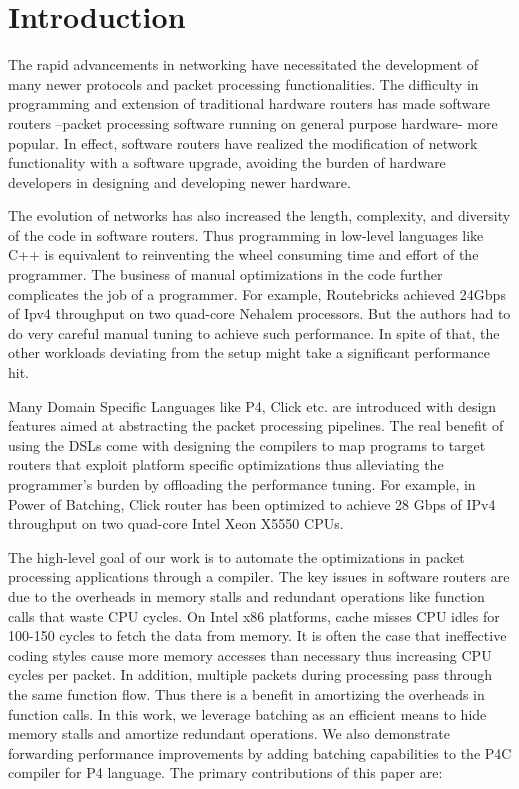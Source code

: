 \section{Introduction}
\label{introduction}
The rapid advancements in networking have necessitated the development of many newer protocols and packet processing functionalities. The difficulty in programming and extension of traditional hardware routers has made software routers --packet processing software running on general purpose hardware- more popular. In effect, software routers have realized the modification of network functionality with a software upgrade, avoiding the burden of hardware developers in designing and developing newer hardware.

The evolution of networks has also increased the length, complexity, and diversity of the code in software routers. Thus programming in low-level languages like C++ is equivalent to reinventing the wheel consuming time and effort of the programmer. The business of manual optimizations in the code further complicates the job of a programmer. For example, Routebricks achieved 24Gbps of Ipv4 throughput on two quad-core Nehalem processors. But the authors had to do very careful manual tuning to achieve such performance. In spite of that, the other workloads deviating from the setup might take a significant performance hit.

Many Domain Specific Languages like P4\cite{Bosshart:2014:PPP:2656877.2656890}, Click\cite{kohler2000click} etc. are introduced with design features aimed at abstracting the packet processing pipelines. The real benefit of using the DSLs come with designing the compilers to map programs to target routers that exploit platform specific optimizations thus alleviating the programmer's burden by offloading the performance tuning. For example, in Power of Batching\cite{Kim:2012:PBC:2349896.2349910}, Click router has been optimized to achieve 28 Gbps of IPv4 throughput on two quad-core Intel Xeon X5550 CPUs.

The high-level goal of our work is to automate the optimizations in packet processing applications through a compiler. The key issues in software routers are due to the overheads in memory stalls and redundant operations like function calls that waste CPU cycles. On Intel x86 platforms, cache misses CPU idles for 100-150 cycles to fetch the data from memory. It is often the case that ineffective coding styles cause more memory accesses than necessary thus increasing CPU cycles per packet.  In addition, multiple packets during processing pass through the same function flow. Thus there is a benefit in amortizing the overheads in function calls. In this work, we leverage batching as an efficient means to hide memory stalls and amortize redundant operations. We also demonstrate forwarding performance improvements by adding batching capabilities to the P4C compiler for P4 language. The primary contributions of this paper are:

